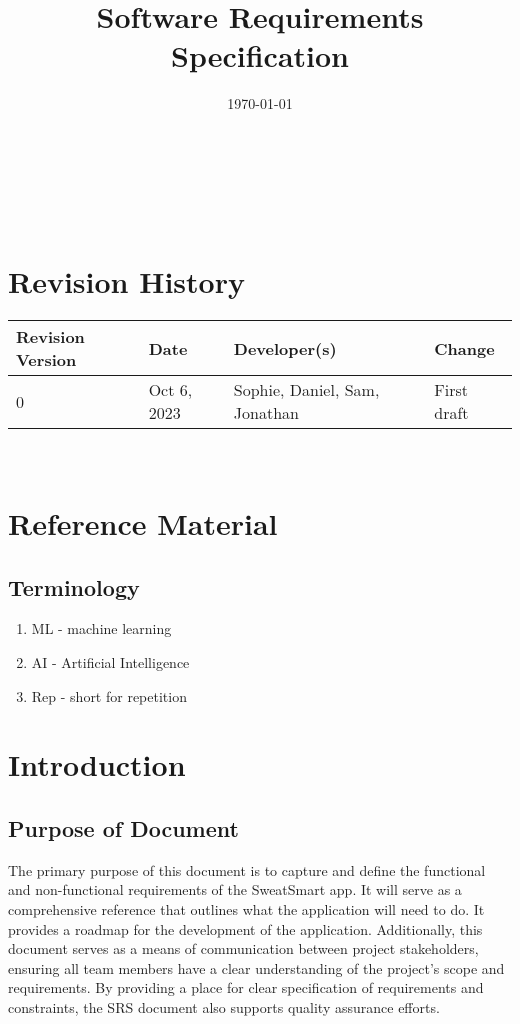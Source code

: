 \documentclass[12pt]{article}
\begin{document}
\title{Software Requirements Specification\\ \progname} 
\author{\authname}
\date{\today}
	
\maketitle

~\newpage


\tableofcontents

~\newpage

\section*{Revision History}

\begin{table}[hp]
		\centering
		\begin{tabularx}{\textwidth}{lllX}
			\toprule
			\textbf{Revision Version} & \textbf{Date} & \textbf{Developer(s)} & \textbf{Change}\\
			\midrule
			0 & Oct 6, 2023 & Sophie, Daniel, Sam, Jonathan & First draft\\
			\bottomrule
		\end{tabularx}
	\end{table}


~\newpage

\section{Reference Material}

\subsection{Terminology}
\begin{enumerate}
    \item ML - machine learning
    \item AI - Artificial Intelligence 
    \item Rep - short for repetition 
\end{enumerate}


\section{Introduction}

\subsection{Purpose of Document}
The primary purpose of this document is to capture and define the functional and non-functional requirements of the SweatSmart app. It will serve as a comprehensive reference that outlines what the application will need to do. It provides a roadmap for the development of the application. Additionally, this document serves as a means of communication between project stakeholders, ensuring all team members have a clear understanding of the project’s scope and requirements. By providing a place for clear specification of requirements and constraints, the SRS document also supports quality assurance efforts.
\end{document}
